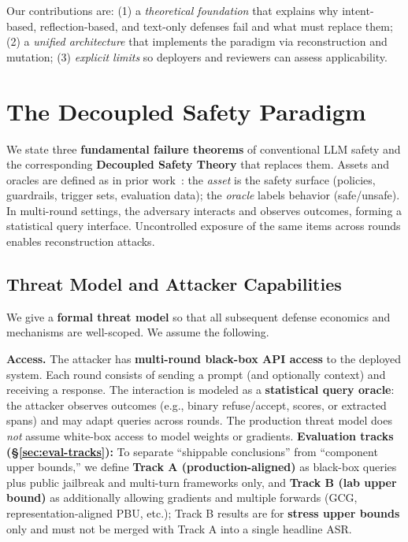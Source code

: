 \documentclass[letterpaper,twocolumn,10pt]{article}
\begin{document}
Our contributions are: (1) a \emph{theoretical foundation} that explains why intent-based, reflection-based, and text-only defenses fail and what must replace them; (2) a \emph{unified architecture} that implements the paradigm via reconstruction and mutation; (3) \emph{explicit limits} so deployers and reviewers can assess applicability.

\section{The Decoupled Safety Paradigm}
\label{sec:paradigm}

We state three \textbf{fundamental failure theorems} of conventional LLM safety and the corresponding \textbf{Decoupled Safety Theory} that replaces them. Assets and oracles are defined as in prior work~\cite{llm-reconstruction-emergent,ControlledMutation_SafetyEval}: the \emph{asset} is the safety surface (policies, guardrails, trigger sets, evaluation data); the \emph{oracle} labels behavior (safe/unsafe). In multi-round settings, the adversary interacts and observes outcomes, forming a statistical query interface. Uncontrolled exposure of the same items across rounds enables reconstruction attacks.

\subsection{Threat Model and Attacker Capabilities}
\label{sec:threat-model}

We give a \textbf{formal threat model} so that all subsequent defense economics and mechanisms are well-scoped. We assume the following.

\textbf{Access.} The attacker has \textbf{multi-round black-box API access} to the deployed system. Each round consists of sending a prompt (and optionally context) and receiving a response. The interaction is modeled as a \textbf{statistical query oracle}: the attacker observes outcomes (e.g., binary refuse/accept, scores, or extracted spans) and may adapt queries across rounds. The production threat model does \emph{not} assume white-box access to model weights or gradients. \textbf{Evaluation tracks (\S\ref{sec:eval-tracks}):} To separate ``shippable conclusions'' from ``component upper bounds,'' we define \textbf{Track A (production-aligned)} as black-box queries plus public jailbreak and multi-turn frameworks only, and \textbf{Track B (lab upper bound)} as additionally allowing gradients and multiple forwards (GCG, representation-aligned PBU, etc.); Track B results are for \textbf{stress upper bounds} only and must not be merged with Track A into a single headline ASR.
\end{document}
